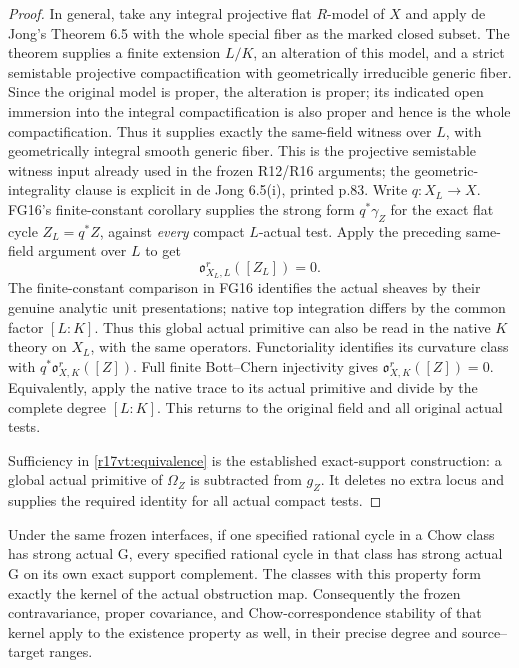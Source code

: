 \begin{proof}
In general, take any integral projective flat $R$-model of
$X$ and apply de Jong's Theorem 6.5 with the whole special
fiber as the marked closed subset. The theorem supplies a
finite extension $L/K$, an alteration of this model, and a
strict semistable projective compactification with
geometrically irreducible generic fiber. Since the original
model is proper, the alteration is proper; its indicated
open immersion into the integral compactification is also
proper and hence is the whole compactification. Thus it
supplies exactly the same-field witness over $L$, with
geometrically integral smooth generic fiber. This is the
projective semistable witness input already used in the
frozen R12/R16 arguments; the geometric-integrality clause
is explicit in de Jong 6.5(i), printed p.83. Write
$q:X_L\to X$. FG16's finite-constant corollary supplies
the strong form $q^*\gamma_Z$ for the exact flat cycle
$Z_L=q^*Z$, against \emph{every} compact $L$-actual test.
Apply the preceding same-field argument over $L$ to get
\[
                         \mathfrak o_{X_L,L}^r([Z_L])=0.
\]
The finite-constant comparison in FG16 identifies the actual
sheaves by their genuine analytic unit presentations;
native top integration differs by the common factor
$[L:K]$. Thus this global actual primitive can also be read
in the native $K$ theory on $X_L$, with the same operators.
Functoriality identifies its curvature class with
$q^*\mathfrak o_{X,K}^r([Z])$. Full finite Bott--Chern
injectivity gives $\mathfrak o_{X,K}^r([Z])=0$.
Equivalently, apply the native trace to its actual primitive
and divide by the complete degree $[L:K]$. This returns to
the original field and all original actual tests.

Sufficiency in \eqref{r17vt:equivalence} is the established
exact-support construction: a global actual primitive of
$\Omega_Z$ is subtracted from $g_Z$. It deletes no extra
locus and supplies the required identity for all actual
compact tests.
\end{proof}

\begin{corollary}
\label{r17vt:Chow-existence}
Under the same frozen interfaces, if one specified rational
cycle in a Chow class has strong actual G, every specified
rational cycle in that class has strong actual G on its own
exact support complement. The classes with this property
form exactly the kernel of the actual obstruction map.
Consequently the frozen contravariance, proper covariance,
and Chow-correspondence stability of that kernel apply to
the existence property as well, in their precise degree
and source--target ranges.
\end{corollary}

